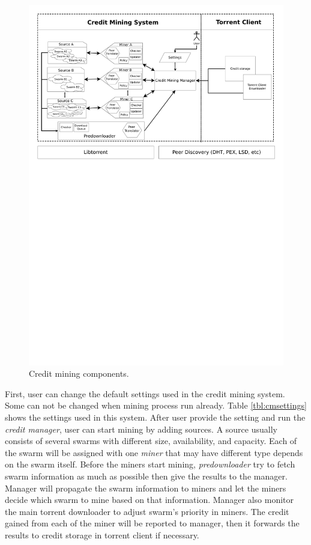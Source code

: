 \begin{figure}[ht]
	\centering
	\includegraphics[width=\textwidth]{pics/cm_components.pdf}
	\caption{Credit mining components.}
	\label{fig:cmcomponents}
\end{figure}

First, user can change the default settings used in the credit mining system. Some can not be changed when mining process run already. Table \ref{tbl:cmsettings} shows the settings used in this system. After user provide the setting and run the \textit{credit manager}, user can start mining by adding sources. A source usually consists of several swarms with different size, availability, and capacity. Each of the swarm will be assigned with one \textit{miner} that may have different type depends on the swarm itself. Before the miners start mining, \textit{predownloader} try to fetch swarm information as much as possible then give the results to the manager. Manager will propagate the swarm information to miners and let the miners decide which swarm to mine based on that information. Manager also monitor the main torrent downloader to adjust swarm's priority in miners. The credit gained from each of the miner will be reported to manager, then it forwards the results to credit storage in torrent client if necessary.


